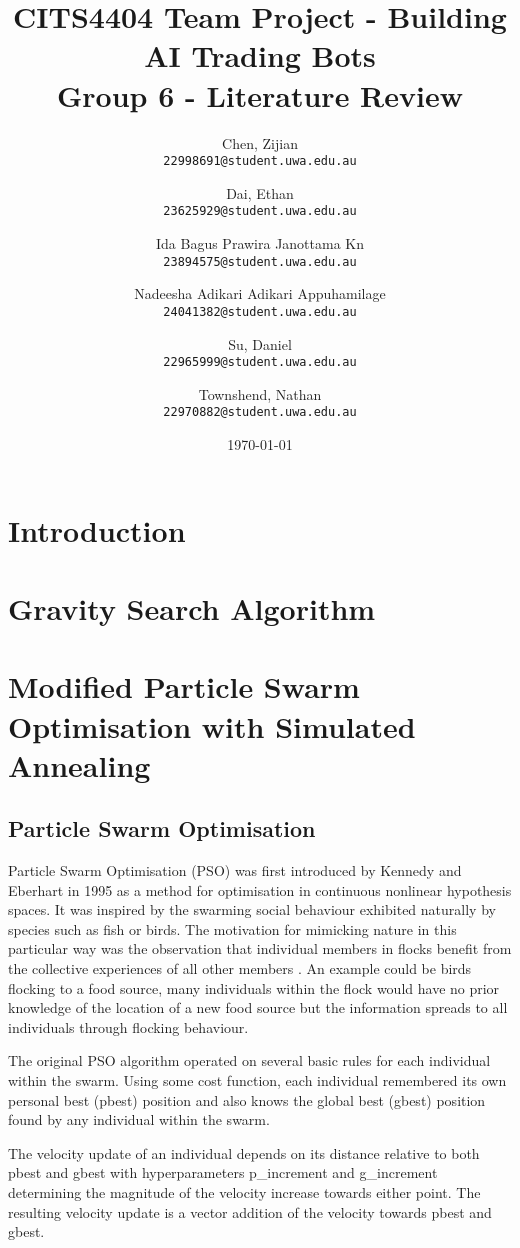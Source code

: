 \documentclass[a4paper, 12pt]{extarticle}
\title{
    CITS4404 Team Project - Building AI Trading Bots
    \\ \large Group 6 - Literature Review
}
\author{
    Chen, Zijian\\
    \normalsize \texttt{22998691@student.uwa.edu.au}
    \and
    Dai, Ethan\\
    \normalsize \texttt{23625929@student.uwa.edu.au}
    \and
    Ida Bagus Prawira Janottama Kn\\
    \normalsize \texttt{23894575@student.uwa.edu.au}
    \and
    Nadeesha Adikari Adikari Appuhamilage\\
    \normalsize \texttt{24041382@student.uwa.edu.au}
    \and
    Su, Daniel\\
    \normalsize \texttt{22965999@student.uwa.edu.au}
    \and
    Townshend, Nathan\\
    \normalsize \texttt{22970882@student.uwa.edu.au}
}
\date{\today}
\begin{document}
\clearpage

\maketitle


\newpage
\tableofcontents


\newpage
\section{Introduction}\label{sec:intro}
% 


\newpage
\section{Gravity Search Algorithm}\label{sec:alg:gsa}


\newpage
\section{Modified Particle Swarm Optimisation with Simulated Annealing}

\subsection{Particle Swarm Optimisation}

Particle Swarm Optimisation (PSO) was first introduced by Kennedy and Eberhart \cite{kennedy1995particle} in 1995 as a method for optimisation in continuous nonlinear hypothesis spaces. It was inspired by the swarming social behaviour exhibited naturally by species such as fish or birds. The motivation for mimicking nature in this particular way was the observation that individual members in flocks benefit from the collective experiences of all other members \cite{wilson2000sociobiology}. An example could be birds flocking to a food source, many individuals within the flock would have no prior knowledge of the location of a new food source but the information spreads to all individuals through flocking behaviour. 

The original PSO algorithm operated on several basic rules for each individual within the swarm. Using some cost function, each individual remembered its own personal best (pbest) position and also knows the global best (gbest) position found by any individual within the swarm.

The velocity update of an individual depends on its distance relative to both pbest and gbest with hyperparameters p\_increment and g\_increment determining the magnitude of the velocity increase towards either point. The resulting velocity update is a vector addition of the velocity towards pbest and gbest.
\end{document}
